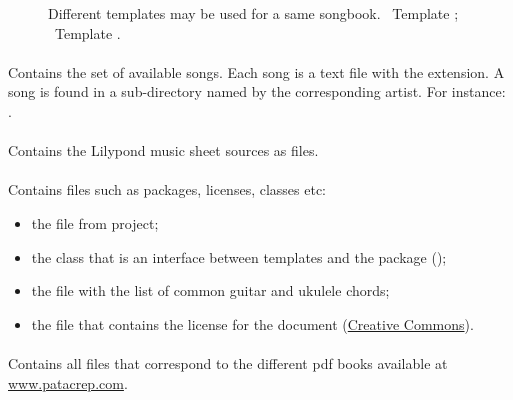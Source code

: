 \begin{figure}
  \centering
  \hspace{0.1cm}%
  \caption[Templates]{%
    Different templates may be used for a same songbook.
    ~Template ; %
    ~Template .%
  }%
  \label{fig:templates}
\end{figure}


\paragraph{}
Contains the set of available songs. Each song is a text file with the
 extension. A song is found in a sub-directory named by the
corresponding artist. For instance:
.

\paragraph{}
Contains the Lilypond music sheet sources as  files.

\paragraph{}
Contains \latex files such as packages, licenses, classes etc:
\begin{itemize}
\item the file  from \songs project;
\item the class  that is an interface between templates
  and the \songs package ();
\item the file  with the list of common guitar and ukulele chords;
\item the file  that contains the license for the
  document (\href{http://creativecommons.org/}{Creative Commons}).
\end{itemize}


\paragraph{}
Contains all  files that correspond to the different pdf books
available at \url{www.patacrep.com}.

